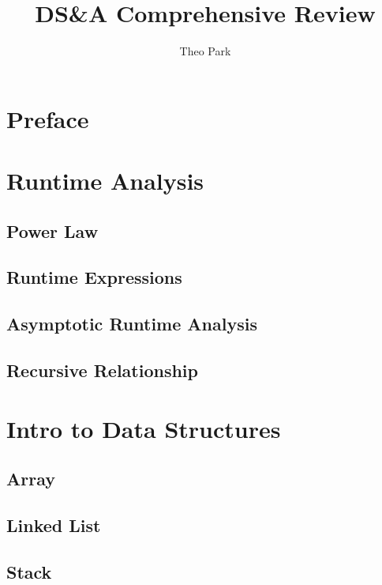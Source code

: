 \documentclass{report}
\title{DS\&A Comprehensive Review}
\author{Theo Park}
\date{}
\begin{document}
\maketitle

\pagestyle{fancy}

\tableofcontents

\chapter*{Preface}


\chapter{Runtime Analysis}

\section{Power Law}

\section{Runtime Expressions}

\section{Asymptotic Runtime Analysis}

\section{Recursive Relationship}


\chapter{Intro to Data Structures}

\section{Array}

\section{Linked List}

\section{Stack}
\end{document}
